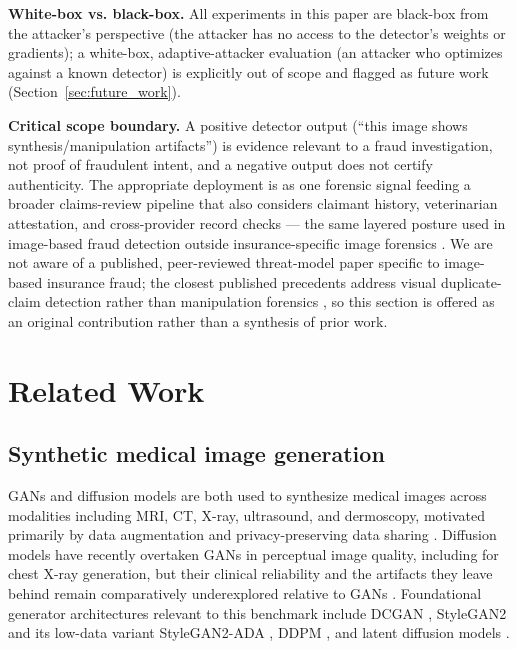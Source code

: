 \documentclass[journal]{IEEEtran}
\begin{document}
\textbf{White-box vs. black-box.} All experiments in this paper are black-box from the attacker's perspective (the attacker has no access to the detector's weights or gradients); a white-box, adaptive-attacker evaluation (an attacker who optimizes against a known detector) is explicitly out of scope and flagged as future work (Section~\ref{sec:future_work}).

\textbf{Critical scope boundary.} A positive detector output (``this image shows synthesis/manipulation artifacts'') is evidence relevant to a fraud investigation, not proof of fraudulent intent, and a negative output does not certify authenticity. The appropriate deployment is as one forensic signal feeding a broader claims-review pipeline that also considers claimant history, veterinarian attestation, and cross-provider record checks — the same layered posture used in image-based fraud detection outside insurance-specific image forensics \cite{car_fraud_cv_2018}. We are not aware of a published, peer-reviewed threat-model paper specific to image-based insurance fraud; the closest published precedents address visual duplicate-claim detection rather than manipulation forensics \cite{car_fraud_cv_2018}, so this section is offered as an original contribution rather than a synthesis of prior work.

\section{Related Work}
\label{sec:related}

\subsection{Synthetic medical image generation}
GANs and diffusion models are both used to synthesize medical images across modalities including MRI, CT, X-ray, ultrasound, and dermoscopy, motivated primarily by data augmentation and privacy-preserving data sharing \cite{synthetic_review_2026}. Diffusion models have recently overtaken GANs in perceptual image quality, including for chest X-ray generation, but their clinical reliability and the artifacts they leave behind remain comparatively underexplored relative to GANs \cite{synthetic_review_2026}. Foundational generator architectures relevant to this benchmark include DCGAN \cite{dcgan_radford2015}, StyleGAN2 \cite{stylegan2_2020} and its low-data variant StyleGAN2-ADA \cite{stylegan2ada_2020}, DDPM \cite{ddpm_2020}, and latent diffusion models \cite{ldm_2022}.
\end{document}
